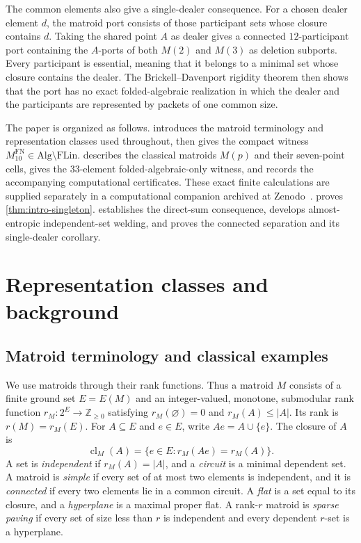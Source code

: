 \documentclass[11pt]{article}
\theoremstyle{definition}
\newcommand{\cl}{\operatorname{cl}}
\newcommand{\FLin}{\mathrm{FLin}}
\newcommand{\Alg}{\mathrm{Alg}}
\begin{document}
The common elements also give a single-dealer consequence.  For a chosen dealer element $d$, the matroid port consists of those participant sets whose closure contains $d$.  Taking the shared point $A$ as dealer gives a connected $12$-participant port containing the $A$-ports of both $M(2)$ and $M(3)$ as deletion subports.  Every participant is essential, meaning that it belongs to a minimal set whose closure contains the dealer.  The Brickell--Davenport rigidity theorem then shows that the port has no exact folded-algebraic realization in which the dealer and the participants are represented by packets of one common size.

The paper is organized as follows.   introduces the matroid terminology and representation classes used throughout, then gives the compact witness $M^{\mathrm{FN}}_{10}\in\Alg\setminus\FLin$.   describes the classical matroids $M(p)$ and their seven-point cells, gives the $33$-element folded-algebraic-only witness, and records the accompanying computational certificates.  These exact finite calculations are supplied separately in a computational companion archived at Zenodo~\cite{KhazaeiCompanion2026}.   proves \cref{thm:intro-singleton}.   establishes the direct-sum consequence, develops almost-entropic independent-set welding, and proves the connected separation and its single-dealer corollary.

\section{Representation classes and background}\label{sec:classes}

\subsection{Matroid terminology and classical examples}\label{subsec:matroid-background}

We use matroids through their rank functions.  Thus a matroid $M$ consists of a finite ground set $E=E(M)$ and an integer-valued, monotone, submodular rank function $r_M:2^E\to\mathbb Z_{\ge0}$ satisfying $r_M(\varnothing)=0$ and $r_M(A)\le |A|$.  Its rank is $r(M)=r_M(E)$.  For $A\subseteq E$ and $e\in E$, write $Ae=A\cup\{e\}$.  The closure of $A$ is
\[
\cl_M(A)=\{e\in E:r_M(Ae)=r_M(A)\}.
\]
A set is \emph{independent} if $r_M(A)=|A|$, and a \emph{circuit} is a minimal dependent set.  A matroid is \emph{simple} if every set of at most two elements is independent, and it is \emph{connected} if every two elements lie in a common circuit.  A \emph{flat} is a set equal to its closure, and a \emph{hyperplane} is a maximal proper flat.  A rank-$r$ matroid is \emph{sparse paving} if every set of size less than $r$ is independent and every dependent $r$-set is a hyperplane.
\end{document}
